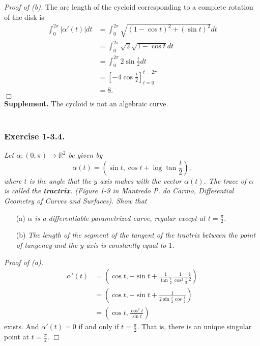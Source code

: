 \documentclass{article}
\begin{document}
\emph{Proof of (b).}
The arc length of the cycloid corresponding to a complete rotation of the disk is
\begin{align*}
  \int_{0}^{2\pi} |\alpha'(t)| dt
  &= \int_{0}^{2\pi} \sqrt{(1-\cos t)^2 + (\sin t)^2} dt \\
  &= \int_{0}^{2\pi} \sqrt{2} \sqrt{1 - \cos t} dt \\
  &= \int_{0}^{2\pi} 2 \sin \frac{t}{2} dt \\
  &= \left[ -4 \cos\frac{t}{2} \right]_{t=0}^{t=2\pi} \\
  &= 8.
\end{align*}
$\Box$ \\

\textbf{Supplement.}
The cycloid is not an algebraic curve. \\\\






\subsubsection*{Exercise 1-3.4.}
\emph{Let $\alpha: (0, \pi) \to \mathbb{R}^2$ be given by
$$\alpha(t) = \left(\sin t, \cos t + \log\tan\frac{t}{2}\right),$$
where $t$ is the angle that the $y$ axis makes with the vector $\alpha(t)$.
The trace of $\alpha$ is called the \textbf{tractrix}.
(Figure 1-9 in Mantredo P. do Carmo, Differential Geometry of Curves and Surfaces).
Show that}
\begin{enumerate}
\item[(a)]
  \emph{$\alpha$ is a differentiable parametrized curve,
  regular except at $t = \frac{\pi}{2}$.}

\item[(b)]
  \emph{The length of the segment of the tangent of the tractrix between
  the point of tangency and the $y$ axis is constantly equal to $1$.} \\
\end{enumerate}

\emph{Proof of (a).}
\begin{align*}
  \alpha'(t)
  &= \left(
    \cos t,
    -\sin t + \frac{1}{\tan\frac{t}{2}} \frac{1}{\cos^{2}\frac{t}{2}} \frac{1}{2}
  \right) \\
  &= \left(
    \cos t,
    -\sin t + \frac{1}{2 \sin\frac{t}{2} \cos\frac{t}{2}}
  \right) \\
  &= \left(
    \cos t,
    \frac{\cos^2 t}{\sin t}
  \right)
\end{align*}
exists.
And $\alpha'(t) = 0$ if and only if $t = \frac{\pi}{2}$.
That is, there is an unique singular point at $t = \frac{\pi}{2}$.
$\Box$ \\
\end{document}

